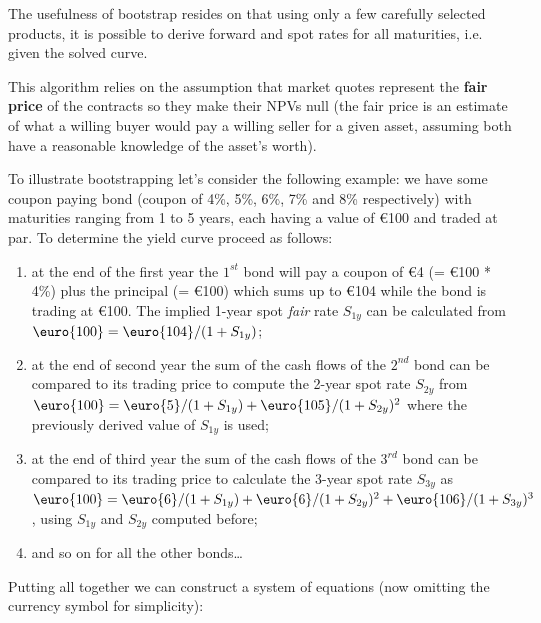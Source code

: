 The usefulness of bootstrap resides on that using only a few carefully selected products, it is possible to derive forward and spot rates for all maturities, i.e. given the solved curve.

This algorithm relies on the assumption that market quotes represent the \textbf{fair price} of the contracts so they make their NPVs null (the fair price is an estimate of what a willing buyer would pay a willing seller for a given asset, assuming both have a reasonable knowledge of the asset's worth).

To illustrate bootstrapping let's consider the following example: we have some coupon paying bond (coupon of 4\%, 5\%, 6\%, 7\% and 8\% respectively) with maturities ranging from 1 to 5 years, each having a value of \euro{100} and traded at par. To determine the yield curve proceed as follows:
\begin{enumerate}
\item at the end of the first year the $1^{st}$ bond will pay a coupon of \euro{4} (= \euro{100} * 4\%) plus the principal (= \euro{100}) which sums up to \euro{104} while the bond is trading at \euro{100}. The implied 1-year spot \emph{fair} rate $S_{1y}$ can be calculated from $\mbox{\euro{100}} = \mbox{\euro{104}} / (1 + S_{1y})$;

\item at the end of second year the sum of the cash flows of the $2^{nd}$ bond can be compared to its trading price to compute the 2-year spot rate $S_{2y}$ from $\mbox{\euro{100}} = \mbox{\euro{5}} / (1 + S_{1y}) + \mbox{\euro{105}} / (1 + S_{2y})^{2}$ where the previously derived value of $S_{1y}$ is used;

\item at the end of third year the sum of the cash flows of the $3^{rd}$ bond can be compared to its trading price to calculate the 3-year spot rate $S_{3y}$ as $\mbox{\euro{100}} = \mbox{\euro{6}} / (1 + S_{1y}) + \mbox{\euro{6}} / (1 + S_{2y})^{2} + \mbox{\euro{106}} / (1 + S_{3y})^{3}$, using $S_{1y}$ and $S_{2y}$ computed before;

\item and so on for all the other bonds\ldots
\end{enumerate}

Putting all together we can construct a system of equations (now omitting the currency symbol for simplicity):

